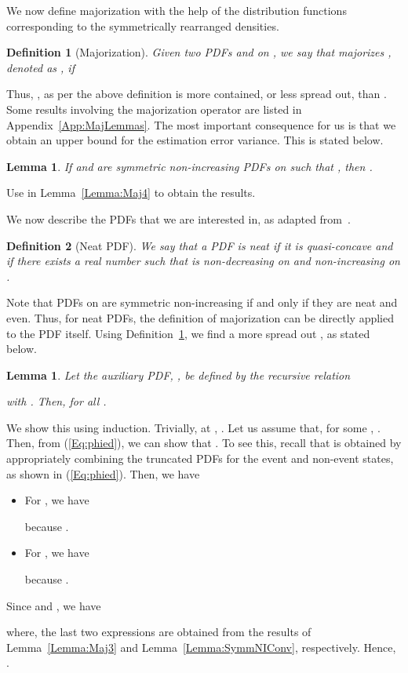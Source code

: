 \documentclass[twocolumn]{autart}
\newtheorem{lemma}[theorem]{Lemma}
\newtheorem{definition}{Definition}[section]
\newenvironment{proof}[1][Proof]{\begin{trivlist}
\item[\hskip \labelsep {\bfseries #1}]}{\end{trivlist}}
\renewcommand{\qed}{}
\begin{document}
We now define majorization with the help of the distribution functions corresponding to the symmetrically rearranged densities.
\begin{definition} [Majorization] \label{Def:Maj}
Given two PDFs  and  on , we say that  majorizes , denoted as , if

\end{definition}
Thus, , as per the above definition is more contained, or less spread out, than . Some results involving the majorization operator are listed in Appendix~\ref{App:MajLemmas}. The most important consequence for us is that we obtain an upper bound for the estimation error variance. This is stated below.
\begin{lemma} \textbf{} \label{Lemma:EstErrCovOrdering}
If  and  are symmetric non-increasing PDFs on  such that , then .
\end{lemma}
\begin{proof}
Use  in Lemma~\ref{Lemma:Maj4} to obtain the results. \hfill \qed
\end{proof}

We now describe the PDFs that we are interested in, as adapted from~\cite{Lipsa2011}.
\begin{definition} [Neat PDF] \label{Def:NeatPDF}
We say that a PDF  is \emph{neat} if it is quasi-concave and if there exists a real number  such that  is non-decreasing on  and non-increasing on .
\end{definition}

Note that PDFs on  are symmetric non-increasing if and only if they are neat and even. Thus, for neat PDFs, the definition of majorization can be directly applied to the PDF itself. Using Definition~\ref{Def:Maj}, we find a more spread out , as stated below.
\begin{lemma} \label{Lemma:HatPhi}
Let the auxiliary PDF, , be defined by the recursive relation

with . Then,  for all .
\end{lemma}
\begin{proof}
We show this using induction. Trivially, at , . Let us assume that, for some , . Then, from (\ref{Eq:phied}), we can show that . To see this, recall that  is obtained by appropriately combining the truncated PDFs for the event and non-event states, as shown in (\ref{Eq:phied}). Then, we have
\begin{itemize}
\item For , we have

because .
\item For , we have

because .
\end{itemize}

Since  and , we have

where, the last two expressions are obtained from the results of Lemma~\ref{Lemma:Maj3} and Lemma~\ref{Lemma:SymmNIConv}, respectively. Hence, . \hfill \qed
\end{proof}
\end{document}

